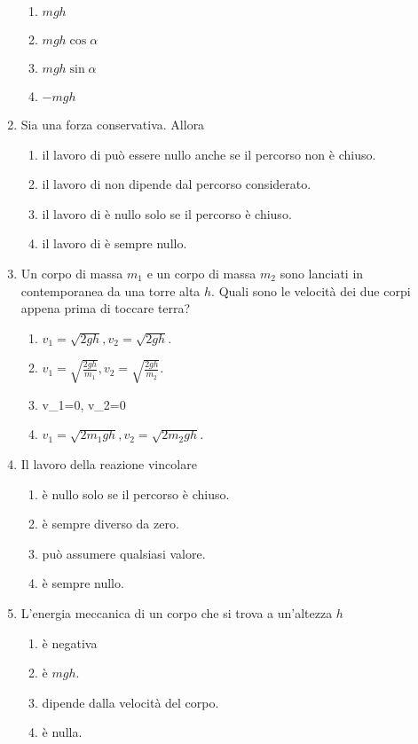 \documentclass{article}
\begin{document}
\begin{enumerate}
\begin{enumerate}[label=\Alph*.]
    \item $mgh$
    \item $mgh\cos\alpha$
    \item $mgh\sin\alpha$
    \item $-mgh$
  \end{enumerate}
  \item Sia  una forza conservativa. Allora
  \begin{enumerate}[label=\Alph*.]
    \item il lavoro di  può essere nullo anche se il percorso non è chiuso.
    \item il lavoro di  non dipende dal percorso considerato.
    \item il lavoro di  è nullo solo se il percorso è chiuso.
    \item il lavoro di  è sempre nullo.
  \end{enumerate}
  \item Un corpo di massa $m_1$ e un corpo di massa $m_2$ sono lanciati in contemporanea da una torre alta $h$. Quali sono le velocità dei due corpi appena prima di toccare terra?
  \begin{enumerate}[label=\Alph*.]
    \item $v_1=\sqrt{2gh}, v_2=\sqrt{2gh}$.
    \item $v_1=\sqrt{\frac{2gh}{m_1}}, v_2=\sqrt{\frac{2gh}{m_2}}$.
    \item v_1=0, v_2=0
    \item $v_1=\sqrt{2m_1gh}, v_2=\sqrt{2m_2gh}$.
  \end{enumerate}
  \item Il lavoro della reazione vincolare
  \begin{enumerate}[label=\Alph*.]
    \item è nullo solo se il percorso è chiuso.
    \item è sempre diverso da zero.
    \item può assumere qualsiasi valore.
    \item è sempre nullo.
  \end{enumerate}
  \item L'energia meccanica di un corpo che si trova a un'altezza $h$
  \begin{enumerate}[label=\Alph*.]
    \item è negativa
    \item è $mgh$.
    \item dipende dalla velocità del corpo.
    \item è nulla.

\end{enumerate}
\end{enumerate}
\end{document}
